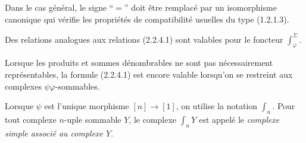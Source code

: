 Dans le cas général, le signe ``$=$'' doit être remplacé par un isomorphisme
canonique qui vérifie les propriétés de compatibilité usuelles du type
(1.2.1.3).

Des relations analogues aux relations (2.2.4.1) sont valables pour le
foncteur $\int_{\varphi}^{\Sigma}$.

Lorsque les produits et sommes dénombrables ne sont pas nécessairement
représentables, la formule (2.2.4.1) est encore valable lorsqu'on se
restreint aux complexes $\psi\varphi$-sommables.

Lorsque $\psi$ est l'unique morphisme $[n]\longrightarrow[1]$, on utilise
la notation $\int_n$. Pour tout complexe $n$-uple sommable $Y$, le complexe
$\int_n Y$ est appelé le \emph{complexe simple associé au complexe $Y$}.
